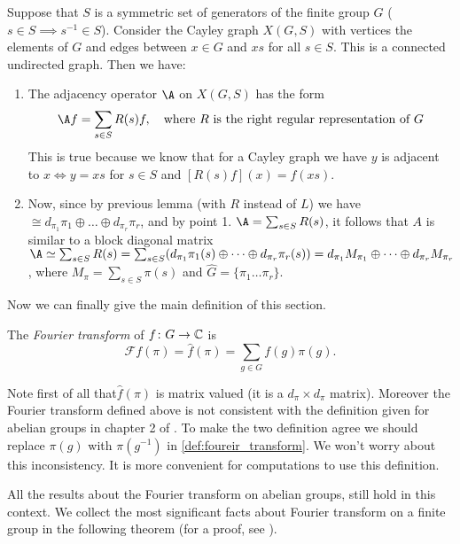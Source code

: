 \begin{ex}
Suppose  that $S$  is  a  symmetric  set  of  generators  of  the finite group $G$ ($s\in S \implies s^{-1}\in S$). Consider the Cayley graph $X(G,S)$   with vertices the elements  of $G$  and edges between $x \in G$   and $xs$  for  all $s\in S$.  This is a connected undirected  graph. Then we have:
\begin{enumerate}
\item The adjacency operator $\A$ on $X(G,S)$ has the form
\[
\A f = \sum_{s\in S}R(s)f, \quad \text{where $R$ is the right regular representation of $G$} \]
This is true because we know that for a Cayley graph we have $y$ is adjacent to $x \iff y=xs$ for $s\in S$ and $[R(s)f](x)=f(xs)$.
\item Now, since by previous lemma (with $R$ instead of $L$) we have $\cong d_{\pi_1}\pi_1\oplus\dots\oplus d_{\pi_r}\pi_r$, and by point 1. $\A=\sum_{s\in S}R(s)$, it follows that $A$ is similar to a block diagonal matrix $\A\simeq \sum_{s\in S}R(s)=\sum_{s\in S}(d_{\pi_1}\pi_1(s)\oplus\dots\oplus d_{\pi_r}\pi_r(s))= d_{\pi_1}M_{\pi_1}\oplus\dots\oplus d_{\pi_r}M_{\pi_r}$, where $M_\pi=\sum_{s\in S}\pi(s)$ and $\hat{G}=\{\pi_1\dots\pi_r\}$.
\end{enumerate}
\end{ex}
Now we can finally give the main definition of this section.
\begin{defn}
The \emph{Fourier transform} of $f\colon G\rightarrow {\mathbb C}$ is
\begin{equation}
\label{def:foureir_transform}
\mathscr{F}f(\pi)=\hat{f}(\pi)=\sum_{g\in G} f(g)\pi(g).
\end{equation}
\end{defn}
\begin{rem}
Note first of all that$\hat{f}(\pi)$ is matrix valued (it is a $d_\pi\times d_\pi$ matrix). Moreover the Fourier transform  defined  above is not consistent with the definition given for abelian groups in chapter 2 of \cite{terras_1999}. To make the two definition agree we should replace $\pi(g)$ with $\pi(g^{-1})$ in \eqref{def:foureir_transform}.    We won't  worry  about this inconsistency. It is more convenient for computations to use this  definition.
\end{rem}
All the results about the Fourier transform on abelian groups, still hold in this context. We collect the most significant facts about Fourier transform on a finite group in the following theorem (for a proof, see \cite{terras_1999}).
